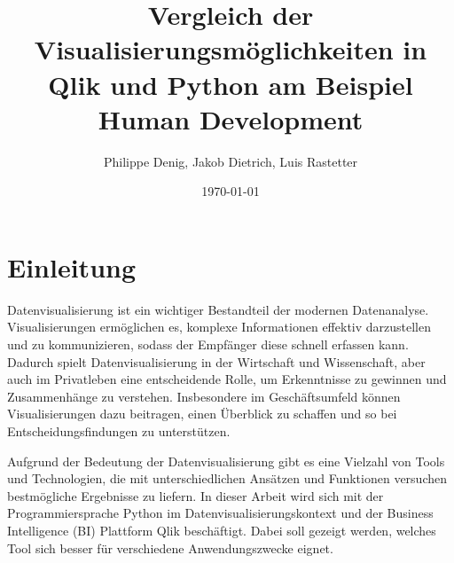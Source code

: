 \documentclass[12pt]{article}
\begin{document}
	
	\title{Vergleich der Visualisierungsmöglichkeiten in Qlik und Python am Beispiel Human Development}
	\author{Philippe Denig, Jakob Dietrich, Luis Rastetter}
	\date{\today}
	
	\maketitle
	
	\newpage
	
	\tableofcontents
	
	\newpage
	
	
	\section{Einleitung} %
	
	
	Datenvisualisierung ist ein wichtiger Bestandteil der modernen Datenanalyse. Visualisierungen ermöglichen es, komplexe Informationen effektiv darzustellen und zu kommunizieren, sodass der Empfänger diese schnell erfassen kann. Dadurch spielt Datenvisualisierung in der Wirtschaft und Wissenschaft, aber auch im Privatleben eine entscheidende Rolle, um Erkenntnisse zu gewinnen und Zusammenhänge zu verstehen. Insbesondere im Geschäftsumfeld können Visualisierungen dazu beitragen, einen Überblick zu schaffen und so bei Entscheidungsfindungen zu unterstützen.
	
	Aufgrund der Bedeutung der Datenvisualisierung gibt es eine Vielzahl von Tools und Technologien, die mit unterschiedlichen Ansätzen und Funktionen versuchen bestmögliche Ergebnisse zu liefern. In dieser Arbeit wird sich mit der Programmiersprache Python im Datenvisualisierungskontext und der Business Intelligence (BI) Plattform Qlik beschäftigt. Dabei soll gezeigt werden, welches Tool sich besser für verschiedene Anwendungszwecke eignet.
	
\end{document}
